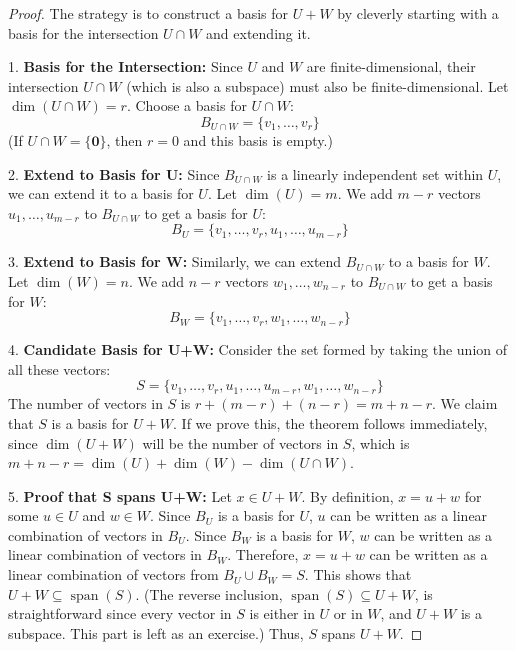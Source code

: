 \documentclass[11pt]{article}
\theoremstyle{plain}
\theoremstyle{definition}
\theoremstyle{remark}
\DeclareMathOperator{\dimv}{dim} %
\DeclareMathOperator{\spanv}{span}
\newcommand{\veczero}{\mathbf{0}} %
\begin{document}
\begin{proof}
The strategy is to construct a basis for $U+W$ by cleverly starting with a basis for the intersection $U \cap W$ and extending it.

1.  \textbf{Basis for the Intersection:} Since $U$ and $W$ are finite-dimensional, their intersection $U \cap W$ (which is also a subspace) must also be finite-dimensional. Let $\dimv(U \cap W) = r$. Choose a basis for $U \cap W$:
    \[ B_{U \cap W} = \{v_1, \dots, v_r\} \]
    (If $U \cap W = \{\veczero\}$, then $r=0$ and this basis is empty.)

2.  \textbf{Extend to Basis for U:} Since $B_{U \cap W}$ is a linearly independent set within $U$, we can extend it to a basis for $U$. Let $\dimv(U) = m$. We add $m-r$ vectors $u_1, \dots, u_{m-r}$ to $B_{U \cap W}$ to get a basis for $U$:
    \[ B_U = \{v_1, \dots, v_r, u_1, \dots, u_{m-r}\} \]

3.  \textbf{Extend to Basis for W:} Similarly, we can extend $B_{U \cap W}$ to a basis for $W$. Let $\dimv(W) = n$. We add $n-r$ vectors $w_1, \dots, w_{n-r}$ to $B_{U \cap W}$ to get a basis for $W$:
    \[ B_W = \{v_1, \dots, v_r, w_1, \dots, w_{n-r}\} \]

4.  \textbf{Candidate Basis for U+W:} Consider the set formed by taking the union of all these vectors:
    \[ S = \{v_1, \dots, v_r, u_1, \dots, u_{m-r}, w_1, \dots, w_{n-r}\} \]
    The number of vectors in $S$ is $r + (m-r) + (n-r) = m + n - r$.
    We claim that $S$ is a basis for $U+W$. If we prove this, the theorem follows immediately, since $\dimv(U+W)$ will be the number of vectors in $S$, which is $m+n-r = \dimv(U) + \dimv(W) - \dimv(U \cap W)$.

5.  \textbf{Proof that S spans U+W:}
    Let $x \in U+W$. By definition, $x = u + w$ for some $u \in U$ and $w \in W$.
    Since $B_U$ is a basis for $U$, $u$ can be written as a linear combination of vectors in $B_U$.
    Since $B_W$ is a basis for $W$, $w$ can be written as a linear combination of vectors in $B_W$.
    Therefore, $x = u+w$ can be written as a linear combination of vectors from $B_U \cup B_W = S$.
    This shows that $U+W \subseteq \spanv(S)$.
    (The reverse inclusion, $\spanv(S) \subseteq U+W$, is straightforward since every vector in $S$ is either in $U$ or in $W$, and $U+W$ is a subspace. This part is left as an exercise.)
    Thus, $S$ spans $U+W$.


\end{proof}
\end{document}
